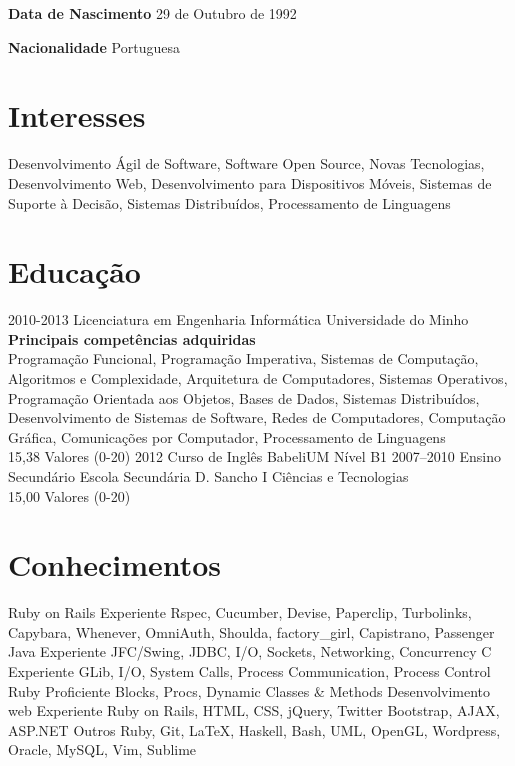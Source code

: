 \documentclass[]{friggeri-cv}
\begin{document}
\begin{multicols}{2}
\textbf{Data de Nascimento} 29 de Outubro de 1992 

\textbf{Nacionalidade} Portuguesa
\end{multicols}

\section{Interesses}

Desenvolvimento Ágil de Software, Software Open Source, Novas Tecnologias, Desenvolvimento Web, Desenvolvimento para Dispositivos 
Móveis, Sistemas de Suporte à Decisão, Sistemas Distribuídos, Processamento de Linguagens 

\section{Educação}

\begin{entrylist}
  \entry
    {2010-2013}
    {Licenciatura em Engenharia Informática}
    {Universidade do Minho}
    {{\bf Principais competências adquiridas} \\ 
    Programação Funcional, Programação Imperativa, 
    Sistemas de Computação, Algoritmos e Complexidade, 
    Arquitetura de Computadores, Sistemas Operativos, 
    Programação Orientada aos Objetos, Bases de Dados,
    Sistemas Distribuídos, Desenvolvimento de Sistemas de Software,
    Redes de Computadores, Computação Gráfica,
    Comunicações por Computador, Processamento de Linguagens
    \\ 15,38 Valores (0-20)}
  \entry
    {2012}
    {Curso de Inglês}
    {BabeliUM}
    {Nível B1}
  \entry
    {2007–2010}
    {Ensino Secundário}
    {Escola Secundária D. Sancho I}
    {Ciências e Tecnologias \\ 15,00 Valores (0-20)}
\end{entrylist}
\newpage
\section{Conhecimentos}

\begin{entrylist}
  \entry
    {}
    {Ruby on Rails}
    {Experiente}
    {Rspec, Cucumber, Devise, Paperclip, Turbolinks, Capybara, Whenever, OmniAuth, Shoulda, factory\_girl, Capistrano, Passenger}
  \entry
    {}
    {Java}
    {Experiente}
    {JFC/Swing, JDBC, I/O, Sockets, Networking, Concurrency}
  \entry
    {}
    {C}
    {Experiente}
    {GLib, I/O, System Calls, Process Communication, Process Control}
  \entry
    {}
    {Ruby}
    {Proficiente}
    {Blocks, Procs, Dynamic Classes \& Methods}
  \entry
    {}
    {Desenvolvimento web}
    {Experiente}
    {Ruby on Rails, HTML, CSS, jQuery, Twitter Bootstrap, AJAX, ASP.NET}
  \entry
    {}
    {Outros}
    {}
    {Ruby, Git, \LaTeX, Haskell, Bash, UML, OpenGL, Wordpress, Oracle, MySQL, Vim, Sublime}
\end{entrylist}
\end{document}
